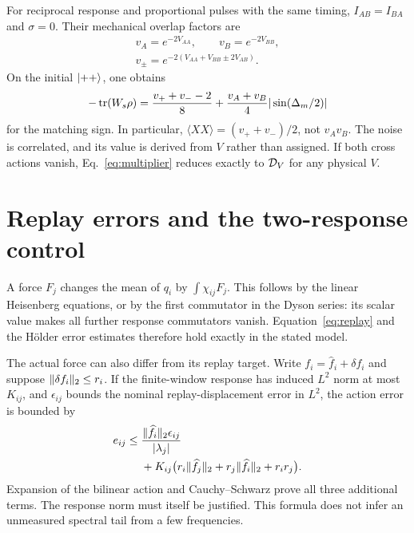 For reciprocal response and proportional pulses with the same timing, $I_{AB}=I_{BA}$ and $\sigma=0$. Their mechanical overlap factors are
\begin{equation}
\begin{gathered}
v_A=e^{-2V_{AA}},\qquad v_B=e^{-2V_{BB}},\\
v_\pm=e^{-2(V_{AA}+V_{BB}\pm2V_{AB})}.
\end{gathered}
\label{eq:visibilities}
\end{equation}
On the initial $\lvert++\rangle$, one obtains
\begin{equation}
-\tr(W_s\rho)=\frac{v_++v_--2}{8}
+\frac{v_A+v_B}{4}|\sin(\Delta_m/2)|
\label{eq:noisywitness}
\end{equation}
for the matching sign. In particular, $\langle XX\rangle=(v_++v_-)/2$, not $v_Av_B$. The noise is correlated, and its value is derived from $V$ rather than assigned. If both cross actions vanish, Eq.~\eqref{eq:multiplier} reduces exactly to $\mathcal D_V$ for any physical $V$.

\section{Replay errors and the two-response control}\label{app:replay}
A force $F_j$ changes the mean of $q_i$ by $\int\chi_{ij}F_j$. This follows by the linear Heisenberg equations, or by the first commutator in the Dyson series: its scalar value makes all further response commutators vanish. Equation~\eqref{eq:replay} and the H\"older error estimates therefore hold exactly in the stated model.

The actual force can also differ from its replay target. Write $f_i=\widehat f_i+\delta f_i$ and suppose $\lVert\delta f_i\rVert_2\le r_i$. If the finite-window response has induced $L^2$ norm at most $K_{ij}$, and $\epsilon_{ij}$ bounds the nominal replay-displacement error in $L^2$, the action error is bounded by
\begin{equation}
\begin{split}
e_{ij}\le{}&\frac{\norm{\widehat f_i}_2\epsilon_{ij}}{|\lambda_j|}\\
&+K_{ij}\bigl(r_i\norm{\widehat f_j}_2+r_j\norm{\widehat f_i}_2+r_ir_j\bigr).
\end{split}
\label{eq:forceerror}
\end{equation}
Expansion of the bilinear action and Cauchy--Schwarz prove all three additional terms. The response norm must itself be justified. This formula does not infer an unmeasured spectral tail from a few frequencies.

